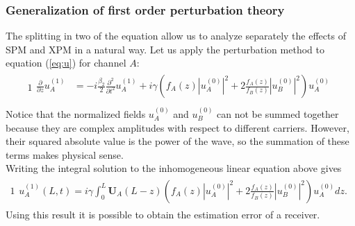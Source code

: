\documentclass[8pt]{beamer} %
\begin{document}
\begin{frame}
    \frametitle{Generalization of first order perturbation theory}
    The splitting in two of the equation allow us to analyze separately the effects of SPM and XPM in a natural way.
    Let us apply the perturbation method to equation  (\ref{eq:u}) for channel $A$:
    \begin{alignat}{1}
        \begin{aligned}
            \frac{\partial}{\partial z} u_A^{(1)} & = -  i \frac{\beta_2}{2} \frac{\partial^2}{\partial t^2} u_A^{(1)} + i \gamma \left(f_A(z)|u_A^{(0)}|^2 + 2 \frac{f_A(z)}{f_B(z)} |u_B^{(0)}|^2 \right)u_A^{(0)} \\
        \end{aligned}
    \end{alignat} \label{eq:perturbation}
    Notice that the normalized fields $u^{(0)}_A$ and $u^{(0)}_B$ can not be summed together because they are complex amplitudes with respect to different carriers. However, their squared absolute value is the power of the wave, so the summation of these terms makes physical sense.\\
    Writing the integral solution to the inhomogeneous linear equation above gives
    \begin{alignat}{1}
        \begin{aligned}
            u_A^{(1)}(L, t) = i\gamma \int_0^L \mathbf{U}_A(L-z)\left(f_A(z)|u_A^{(0)}|^2 + 2 \frac{f_A(z)}{f_B(z)} |u_B^{(0)}|^2 \right)u_A^{(0)} dz.
        \end{aligned}\label{eq:solution}
    \end{alignat}
    Using this result it is possible to obtain the estimation error of a receiver.
\end{frame}
\end{document}
